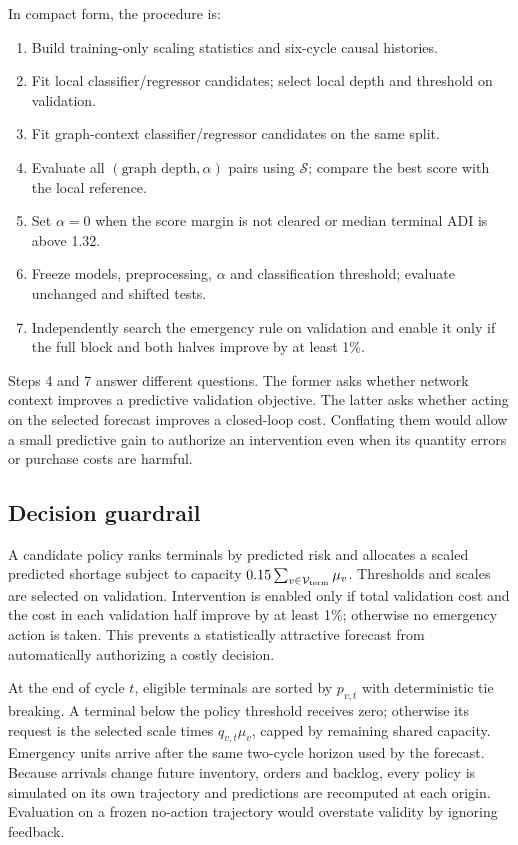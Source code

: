 \documentclass[11pt,a4paper]{article}
\begin{document}
In compact form, the procedure is:
\begin{enumerate}[leftmargin=2.2em,itemsep=.15em]
\item Build training-only scaling statistics and six-cycle causal histories.
\item Fit local classifier/regressor candidates; select local depth and threshold on validation.
\item Fit graph-context classifier/regressor candidates on the same split.
\item Evaluate all $(\text{graph depth},\alpha)$ pairs using $\mathcal S$; compare the best score with the local reference.
\item Set $\alpha=0$ when the score margin is not cleared or median terminal ADI is above 1.32.
\item Freeze models, preprocessing, $\alpha$ and classification threshold; evaluate unchanged and shifted tests.
\item Independently search the emergency rule on validation and enable it only if the full block and both halves improve by at least 1\%.
\end{enumerate}

Steps 4 and 7 answer different questions. The former asks whether network context improves a predictive validation objective. The latter asks whether acting on the selected forecast improves a closed-loop cost. Conflating them would allow a small predictive gain to authorize an intervention even when its quantity errors or purchase costs are harmful.

\subsection{Decision guardrail}
A candidate policy ranks terminals by predicted risk and allocates a scaled predicted shortage subject to capacity $0.15\sum_{v\in\mathcal V_{\rm term}}\mu_v$. Thresholds and scales are selected on validation. Intervention is enabled only if total validation cost and the cost in each validation half improve by at least 1\%; otherwise no emergency action is taken. This prevents a statistically attractive forecast from automatically authorizing a costly decision.

At the end of cycle $t$, eligible terminals are sorted by $p_{v,t}$ with deterministic tie breaking. A terminal below the policy threshold receives zero; otherwise its request is the selected scale times $q_{v,t}\mu_v$, capped by remaining shared capacity. Emergency units arrive after the same two-cycle horizon used by the forecast. Because arrivals change future inventory, orders and backlog, every policy is simulated on its own trajectory and predictions are recomputed at each origin. Evaluation on a frozen no-action trajectory would overstate validity by ignoring feedback.
\end{document}
